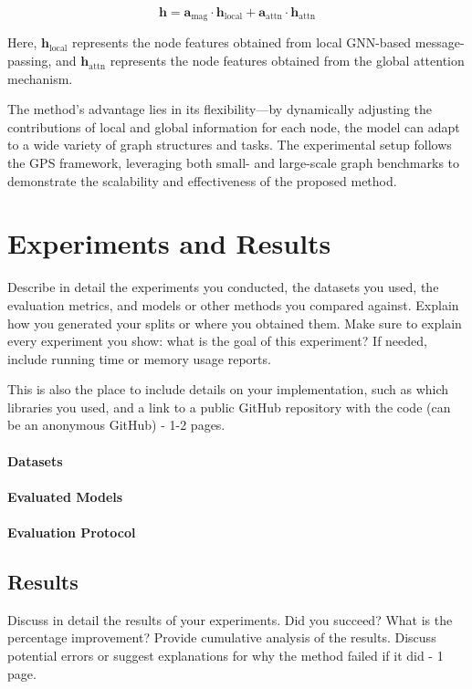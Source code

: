 \documentclass{acmart}
\begin{document}
\[
\mathbf{h} = \mathbf{a}_{\text{mag}} \cdot \mathbf{h}_{\text{local}} + \mathbf{a}_{\text{attn}} \cdot \mathbf{h}_{\text{attn}}
\]

Here, $\mathbf{h}_{\text{local}}$ represents the node features obtained from local GNN-based message-passing, and $\mathbf{h}_{\text{attn}}$ represents the node features obtained from the global attention mechanism.


The method's advantage lies in its flexibility—by dynamically adjusting the contributions of local and global information for each node, the model can adapt to a wide variety of graph structures and tasks. The experimental setup follows the GPS framework, leveraging both small- and large-scale graph benchmarks to demonstrate the scalability and effectiveness of the proposed method.

\section{Experiments and Results}
Describe in detail the experiments you conducted, the datasets you used, the evaluation metrics, and models or other methods you compared against. Explain how you generated your splits or where you obtained them. Make sure to explain every experiment you show: what is the goal of this experiment? If needed, include running time or memory usage reports.

This is also the place to include details on your implementation, such as which libraries you used, and a link to a public GitHub repository with the code (can be an anonymous GitHub) - 1-2 pages.

\paragraph{Datasets}

\paragraph{Evaluated Models}

\paragraph{Evaluation Protocol}

\subsection{Results}
Discuss in detail the results of your experiments. Did you succeed? What is the percentage improvement? Provide cumulative analysis of the results. Discuss potential errors or suggest explanations for why the method failed if it did - 1 page.
\end{document}
